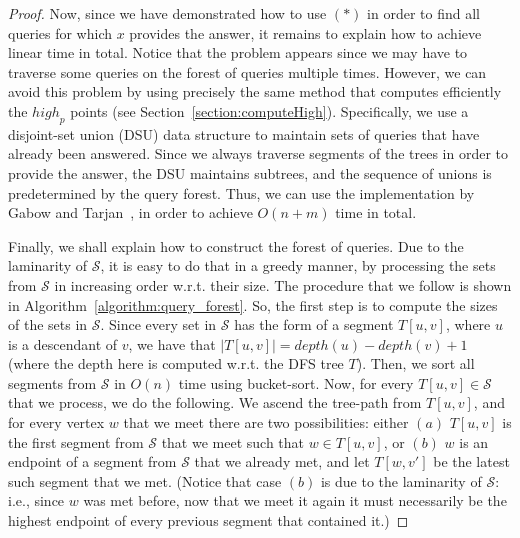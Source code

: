 \documentclass[11pt,a4paper]{article}
\begin{document}
\begin{proof}
Now, since we have demonstrated how to use $(*)$ in order to find all queries for which $x$ provides the answer, it remains to explain how to achieve linear time in total. Notice that the problem appears since we may have to traverse some queries on the forest of queries multiple times. However, we can avoid this problem by using precisely the same method that computes efficiently the $\mathit{high}_p$ points (see Section~\ref{section:computeHigh}). Specifically, we use a disjoint-set union (DSU) data structure to maintain sets of queries that have already been answered. Since we always traverse segments of the trees in order to provide the answer, the DSU maintains subtrees, and the sequence of unions is predetermined by the query forest. Thus, we can use the implementation by Gabow and Tarjan~\cite{DBLP:journals/jcss/GabowT85}, in order to achieve $O(n+m)$ time in total. 

Finally, we shall explain how to construct the forest of queries. Due to the laminarity of $\mathcal{S}$, it is easy to do that in a greedy manner, by processing the sets from $\mathcal{S}$ in increasing order w.r.t. their size. The procedure that we follow is shown in Algorithm~\ref{algorithm:query_forest}. So, the first step is to compute the sizes of the sets in $\mathcal{S}$. Since every set in $\mathcal{S}$ has the form of a segment $T[u,v]$, where $u$ is a descendant of $v$, we have that $|T[u,v]|=\mathit{depth}(u)-\mathit{depth}(v)+1$ (where the depth here is computed w.r.t. the DFS tree $T$). Then, we sort all segments from $\mathcal{S}$ in $O(n)$ time using bucket-sort. Now, for every $T[u,v]\in\mathcal{S}$ that we process, we do the following. We ascend the tree-path from $T[u,v]$, and for every vertex $w$ that we meet there are two possibilities: either $(a)$ $T[u,v]$ is the first segment from $\mathcal{S}$ that we meet such that $w\in T[u,v]$, or $(b)$ $w$ is an endpoint of a segment from $\mathcal{S}$ that we already met, and let $T[w,v']$ be the latest such segment that we met. (Notice that case $(b)$ is due to the laminarity of $\mathcal{S}$: i.e., since $w$ was met before, now that we meet it again it must necessarily be the highest endpoint of every previous segment that contained it.) 


\end{proof}
\end{document}
